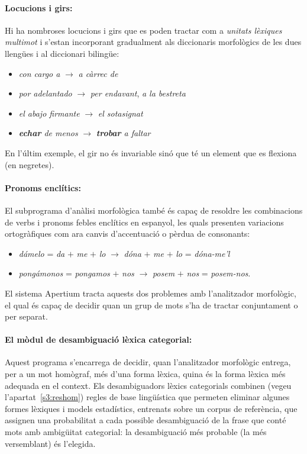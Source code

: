  \paragraph{Locucions i girs:} Hi ha nombroses locucions i girs que es
 poden tractar com a \emph{unitats lèxiques multimot} i s'estan
 incorporant gradualment als diccionaris morfològics de les dues
 llengües i al diccionari bilingüe:
 \begin{itemize}
 \item \emph{con cargo a} $\rightarrow$ \emph{a càrrec de}
 \item \emph{por adelantado} $\rightarrow$ \emph{per endavant}, \emph{a la bestreta}
 \item \emph{el abajo firmante} $\rightarrow$ \emph{el sotasignat}
 \item \emph{{\bf echar} de menos} $\rightarrow$ \emph{{\bf trobar} a faltar}
 \end{itemize}
 En l'últim exemple, el gir no és invariable sinó que té un element que
 es flexiona (en negretes).

 \paragraph{Pronoms enclítics:} El subprograma d'anàlisi morfològica també és capaç de resoldre les
 combinacions de verbs i pronoms febles enclítics en espanyol, les
 quals presenten variacions ortogràfiques com ara canvis d'accentuació
 o pèrdua de consonants:
 \begin{itemize}
 \item \emph{d\'{a}melo} = \emph{da} $+$ \emph{me} $+$ \emph{lo} $\rightarrow$
 \emph{dóna} $+$ \emph{me} $+$ \emph{lo} = \emph{dóna-me'l}
 \item \emph{pong\'{a}monos} = \emph{pongamos} $+$ \emph{nos} $\rightarrow$ {\em
 posem} $+$ \emph{nos} = \emph{posem-nos}.  
 \end{itemize}

 El sistema Apertium tracta aquests dos problemes amb l'analitzador
 morfològic, el qual és capaç de decidir quan un grup de mots s'ha de
 tractar conjuntament o per separat.

 \paragraph{El mòdul de desambiguació lèxica categorial:}
Aquest programa s'encarrega de decidir, quan l'analitzador morfològic
entrega, per a un mot homògraf, més d'una forma lèxica, quina és la
forma lèxica més adequada en el context. Els desambiguadors lèxics
categorials combinen (vegeu l'apartat~\ref{s3:reshom}) regles de base
lingüística que permeten eliminar algunes formes lèxiques i models
estadístics, entrenats sobre un corpus de referència, que assignen una
probabilitat a cada possible desambiguació de la frase que conté mots
amb ambigüitat categorial: la desambiguació més probable (la més
versemblant) és l'elegida.

